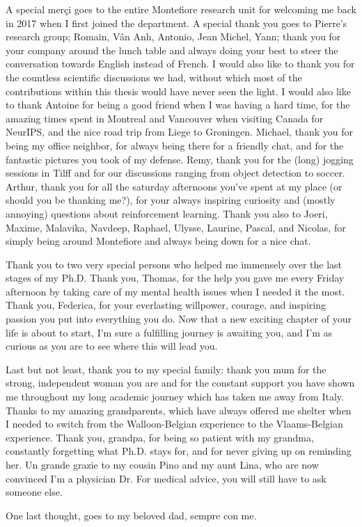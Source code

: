 A special merçi goes to the entire Montefiore research unit for welcoming me back in 2017 when I first joined the department. A special thank you goes to Pierre's research group; Romain, Vân Anh, Antonio, Jean Michel, Yann; thank you for your company around the lunch table and always doing your best to steer the conversation towards English instead of French. I would also like to thank you for the countless scientific discussions we had, without which most of the contributions within this thesis would have never seen the light. I would also like to thank Antoine for being a good friend when I was having a hard time, for the amazing times spent in Montreal and Vancouver when visiting Canada for NeurIPS, and the nice road trip from Liege to Groningen. Michael, thank you for being my office neighbor, for always being there for a friendly chat, and for the fantastic pictures you took of my defense. Remy, thank you for the (long) jogging sessions in Tilff and for our discussions ranging from object detection to soccer. Arthur, thank you for all the saturday afternoons you've spent at my place (or should you be thanking me?), for your always inspiring curiosity and (mostly annoying) questions about reinforcement learning. Thank you also to Joeri, Maxime, Malavika, Navdeep, Raphael, Ulysse, Laurine, Pascal, and Nicolas, for simply being around Montefiore and always being down for a nice chat.

Thank you to two very special persons who helped me immensely over the last stages of my Ph.D. Thank you, Thomas, for the help you gave me every Friday afternoon by taking care of my mental health issues when I needed it the most. Thank you, Federica, for your everlasting willpower, courage, and inspiring passion you put into everything you do. Now that a new exciting chapter of your life is about to start, I'm sure a fulfilling journey is awaiting you, and I'm as curious as you are to see where this will lead you.

Last but not least, thank you to my special family: thank you mum for the strong, independent woman you are and for the constant support you have shown me throughout my long academic journey which has taken me away from Italy. Thanks to my amazing grandparents, which have always offered me shelter when I needed to switch from the Walloon-Belgian experience to the Vlaams-Belgian experience. Thank you, grandpa, for being so patient with my grandma, constantly forgetting what Ph.D. stays for, and for never giving up on reminding her. Un grande grazie to my cousin Pino and my aunt Lina, who are now convinced I'm a physician Dr. For medical advice, you will still have to ask someone else. 

One last thought, goes to my beloved dad, sempre con me.


\endgroup
